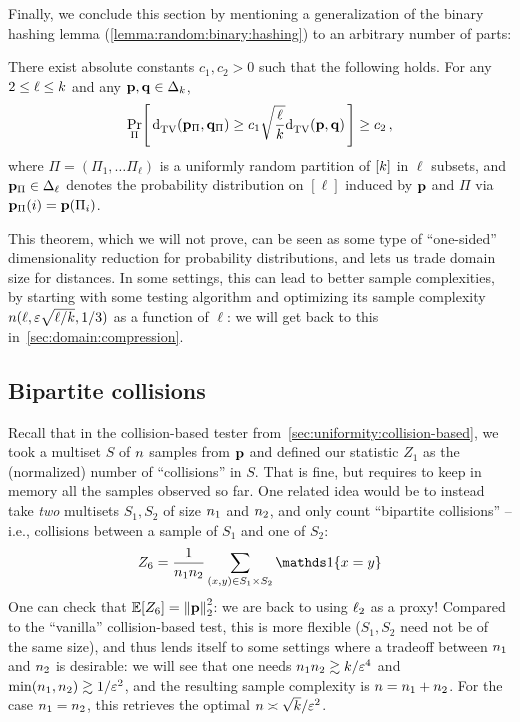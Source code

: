 Finally, we conclude this section by mentioning a generalization of the binary hashing lemma (\cref{lemma:random:binary:hashing}) to an arbitrary number of parts:
\begin{theorem}
  \label{theo:random:dct:hashing}
  There exist absolute constants $c_1,c_2>0$ such that the following holds. For any $2\leq \ell\leq \ab$ and any $\p,\q\in\distribs{\ab}$,
  \[
        \probaDistrOf{\Pi}{ \totalvardist{\p_\Pi}{\q_\Pi} \geq c_1\sqrt{\frac{\ell}{\ab}}\totalvardist{\p}{\q} } \geq c_2\,,
  \] 
  where $\Pi=(\Pi_1,\dots\Pi_\ell)$ is a uniformly random partition of $[\ab]$ in $\ell$ subsets, and $\p_\Pi\in\distribs{\ell}$ denotes the probability distribution on $[\ell]$ induced by $\p$ and $\Pi$ via $\p_\Pi(i) = \p(\Pi_i)$.
\end{theorem}
This theorem, which we will not prove, can be seen as some type of ``one-sided'' dimensionality reduction for probability distributions, and lets us trade domain size for distances. In some settings, this can lead to better sample complexities, \eg by starting with some testing algorithm and optimizing its sample complexity $\ns(\ell, \dst\sqrt{\ell/\ab}, 1/3)$ as a function of $\ell$: we will get back to this in~\cref{sec:domain:compression}.

\subsection{Bipartite collisions} 
  \label{sec:uniformity:bipartite}
Recall that in the collision-based tester from~\cref{sec:uniformity:collision-based}, we took a multiset $S$ of $\ns$ samples from $\p$ and defined our statistic $Z_1$ as the (normalized) number of ``collisions'' in $S$. That is fine, but requires to keep in memory all the samples observed so far. One related idea would be to instead take \emph{two} multisets $S_1,S_2$ of size $\nss$ and $\nst$, and only count ``bipartite collisions'' -- i.e., collisions between a sample of $S_1$ and one of $S_2$:
\begin{equation}
    Z_6 = \frac{1}{\nss \nst}\sum_{(x,y)\in S_1\times S_2} \indic{x=y}
\end{equation}
One can check that $\expect{Z_6} = \normtwo{\p}^2$: we are back to using $\lp[2]$ as a proxy! Compared to the ``vanilla'' collision-based test, this is more flexible ($S_1,S_2$ need not be of the same size), and thus lends itself to some settings where a tradeoff between $\nss$ and $\nst$ is desirable: we will see that one needs $\nss\nst \gtrsim \ab/\dst^4$ and $\min(\nss,\nst)\gtrsim 1/\dst^2$, and the resulting sample complexity is $\ns=\nss+\nst$. For the case $\nss=\nst$, this retrieves the optimal $\ns \asymp \sqrt{\ab}/\dst^2$.


